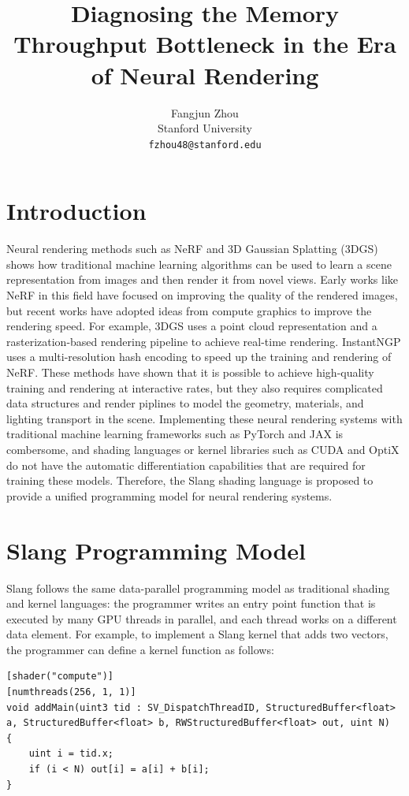 \documentclass{article}
\title{Diagnosing the Memory Throughput Bottleneck in the Era of Neural Rendering}
\author{%
  Fangjun Zhou \\
  Stanford University \\
  \texttt{fzhou48@stanford.edu} \\
}
\begin{document}
\maketitle

\section{Introduction}

Neural rendering methods such as NeRF \cite{mildenhallNeRFRepresentingScenes2020} and 3D Gaussian Splatting (3DGS) \cite{kerbl3DGaussianSplatting2023} shows how traditional machine learning algorithms can be used to learn a scene representation from images and then render it from novel views. Early works like NeRF in this field have focused on improving the quality of the rendered images, but recent works have adopted ideas from compute graphics to improve the rendering speed. For example, 3DGS uses a point cloud representation and a rasterization-based rendering pipeline to achieve real-time rendering. InstantNGP \cite{mullerInstantNeuralGraphics2022} uses a multi-resolution hash encoding to speed up the training and rendering of NeRF. These methods have shown that it is possible to achieve high-quality training and rendering at interactive rates, but they also requires complicated data structures and render piplines to model the geometry, materials, and lighting transport in the scene. Implementing these neural rendering systems with traditional machine learning frameworks such as PyTorch and JAX is combersome, and shading languages or kernel libraries such as CUDA and OptiX do not have the automatic differentiation capabilities that are required for training these models. Therefore, the Slang shading language \cite{bangaruSLANGDFastModular2023} is proposed to provide a unified programming model for neural rendering systems.

\section{Slang Programming Model}

Slang follows the same data-parallel programming model as traditional shading and kernel languages: the programmer writes an entry point function that is executed by many GPU threads in parallel, and each thread works on a different data element. For example, to implement a Slang kernel that adds two vectors, the programmer can define a kernel function as follows:

\begin{verbatim}
[shader("compute")]
[numthreads(256, 1, 1)]
void addMain(uint3 tid : SV_DispatchThreadID, StructuredBuffer<float> a, StructuredBuffer<float> b, RWStructuredBuffer<float> out, uint N)
{
    uint i = tid.x;
    if (i < N) out[i] = a[i] + b[i];
}
\end{verbatim}
\end{document}
